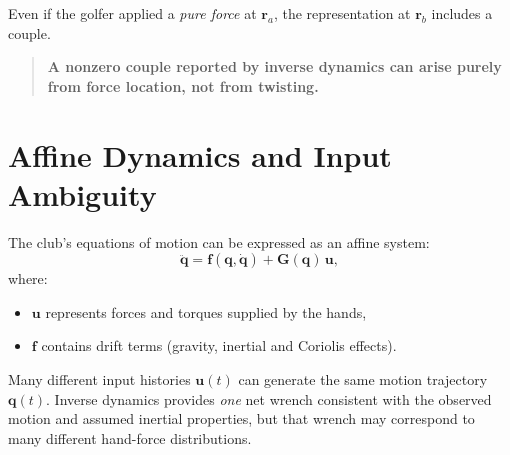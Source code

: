 \documentclass[12pt]{article}
\begin{document}
\begin{center}
\end{center}

Even if the golfer applied a \emph{pure force} at $\mathbf{r}_a$, the representation at $\mathbf{r}_b$ includes a couple.

\begin{quote}
\textbf{A nonzero couple reported by inverse dynamics can arise purely from force location, not from twisting.}
\end{quote}

\section{Affine Dynamics and Input Ambiguity}

The club’s equations of motion can be expressed as an affine system:
\begin{equation}
    \ddot{\mathbf{q}} = \mathbf{f}(\mathbf{q},\dot{\mathbf{q}}) + \mathbf{G}(\mathbf{q})\,\mathbf{u},
\end{equation}
where:
\begin{itemize}
    \item $\mathbf{u}$ represents forces and torques supplied by the hands,
    \item $\mathbf{f}$ contains drift terms (gravity, inertial and Coriolis effects).
\end{itemize}

Many different input histories $\mathbf{u}(t)$ can generate the same motion trajectory $\mathbf{q}(t)$.  
Inverse dynamics provides \emph{one} net wrench consistent with the observed motion and assumed inertial properties, but that wrench may correspond to many different hand-force distributions.
\end{document}
